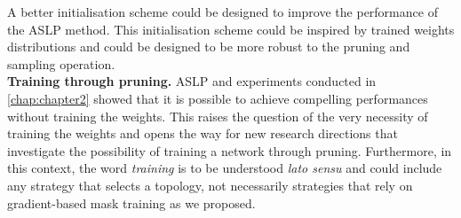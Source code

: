 A better initialisation scheme could be designed to improve the performance of
the \ac{ASLP} method. This initialisation scheme could be inspired by trained
weights distributions and could be designed to be more robust to the pruning and
sampling operation.\\

\noindent \textbf{Training through pruning.} \ac{ASLP} and experiments conducted
in \cref{chap:chapter2} showed that it is possible to achieve compelling
performances without training the weights. This raises the question of the very
necessity of training the weights and opens the way for new research directions
that investigate the possibility of training a network through pruning.
Furthermore, in this context, the word \emph{training} is to be understood
\emph{lato sensu} and could include any strategy that selects a topology, not
necessarily strategies that rely on gradient-based mask training as we proposed.